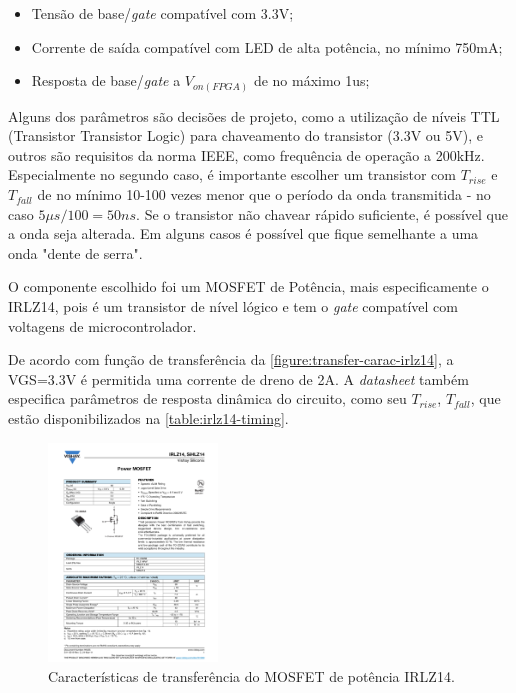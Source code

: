 	\begin{itemize}
		\item Tensão de base/\textit{gate} compatível com 3.3V;
		\item Corrente de saída compatível com LED de alta potência, no mínimo 750mA;
		\item Resposta de base/\textit{gate} a $V_{on(FPGA)}$ de no máximo 1us;
	\end{itemize}
	
	Alguns dos parâmetros são decisões de projeto, como a utilização de níveis TTL (Transistor Transistor Logic) para chaveamento do transistor (3.3V ou 5V), e outros são requisitos da norma IEEE, como frequência de operação a 200kHz. Especialmente no segundo caso, é importante escolher um transistor com $T_{rise}$ e $T_{fall}$ de no mínimo 10-100 vezes menor que o período da onda transmitida - no caso $5\mu$$s/100 = 50ns$. Se o transistor não chavear rápido suficiente, é possível que a onda seja alterada. Em alguns casos é possível que fique semelhante a uma onda "dente de serra".
	
	O componente escolhido foi um MOSFET de Potência, mais especificamente o IRLZ14, pois é um transistor de nível lógico e tem o \textit{gate} compatível com voltagens de microcontrolador. 

	De acordo com função de transferência da \autoref{figure:transfer-carac-irlz14}, a VGS=3.3V é permitida uma corrente de dreno de 2A. A \textit{datasheet} também especifica parâmetros de resposta dinâmica do circuito, como seu $T_{rise}$, $T_{fall}$, que estão disponibilizados na \autoref{table:irlz14-timing}.
	
	\begin{figure}[h]
		\caption{\label{figure:transfer-carac-irlz14}Características de transferência do MOSFET de potência IRLZ14.}
		\centering
		\includegraphics[page=3, width=0.4\textwidth, trim={12cm 16.5cm 2.2cm 5cm}, clip]{circuits/irlz14.pdf}
	\end{figure}

